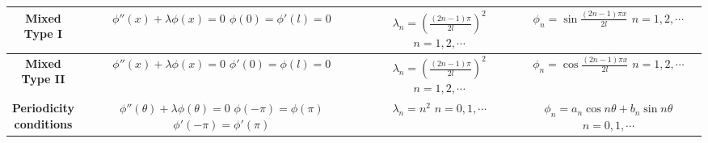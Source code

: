 \begin{center}
\begin{tabular}{|c|c|c|c|}
    \parbox[c][30pt]{90pt}{\centering \textbf{Mixed \\ \vspace{10pt} Type I}} & 
    \parbox[c][60pt]{90pt}{\centering $\phi''(x) + \lambda \phi(x)=0$ \\ \vspace{10pt} $\phi(0)=\phi'(l)=0$}
    & 
    \parbox[c][60pt]{100pt}{\centering $\displaystyle \lambda_{n}=\left( \frac{(2n-1)\pi}{2l} \right)^{2}$ \\ \vspace{10pt} $n=1, 2, \cdots$} & 
    \parbox[c][60pt]{100pt}{\centering $\displaystyle \phi_{n} = \sin\frac{(2n-1)\pi x}{2l}$ \\ \vspace{10pt} $n=1, 2, \cdots$} \\
    \hline
    
    \parbox[c][30pt]{90pt}{\centering \textbf{Mixed \\ \vspace{10pt} Type II}} & 
    \parbox[c][60pt]{90pt}{\centering $\phi''(x) + \lambda \phi(x)=0$ \\ \vspace{10pt} $\phi'(0)=\phi(l)=0$}
    & 
    \parbox[c][60pt]{100pt}{\centering $\displaystyle \lambda_{n}=\left( \frac{(2n-1)\pi}{2l} \right)^{2}$ \\ \vspace{10pt} $n=1, 2, \cdots$} & 
    \parbox[c][60pt]{100pt}{\centering $\displaystyle \phi_{n} = \cos\frac{(2n-1)\pi x}{2l}$ \\ \vspace{10pt} $n=1, 2, \cdots$} \\
    \hline
    
    \parbox[c][30pt]{90pt}{\centering \textbf{Periodicity \\ \vspace{10pt} conditions}} & 
    \parbox[c][80pt]{90pt}{\centering $\phi''(\theta) + \lambda \phi(\theta)=0$ \\ \vspace{10pt} $\phi(-\pi)=\phi(\pi)$ \\ \vspace{10pt} $\phi'(-\pi)=\phi'(\pi)$}
    & 
    \parbox[c][60pt]{100pt}{\centering $\displaystyle \lambda_{n}=n^{2}$ \\ \vspace{10pt} $n=0, 1, \cdots$} & 
    \parbox[c][60pt]{120pt}{\centering $ \phi_{n} = a_{n}\cos n \theta + b_{n}\sin n \theta$ \\ \vspace{10pt} $n=0, 1, \cdots$} \\
    \hline
    

\end{tabular}
\end{center}
